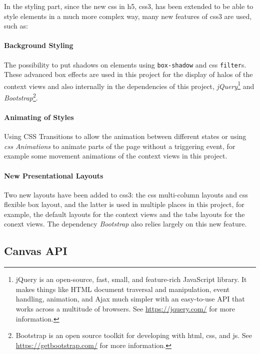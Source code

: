 In the styling part, since the new \gls{css} in \gls{h5}, \gls{css3}, has been extended to be able to style elements in a much more complex way, many new features of \gls{css3} are used, such as:

\paragraph{Background Styling}

The possibility to put shadows on elements using \texttt{box-shadow} and \gls{css} \texttt{filter}s. These advanced box effects are used in this project for the display of halos of the context views and also internally in the dependencies of this project, \emph{jQuery}\footnote{ jQuery is an open-source, fast, small, and feature-rich JavaScript library. It makes things like HTML document traversal and manipulation, event handling, animation, and Ajax much simpler with an easy-to-use API that works across a multitude of browsers. See \url{https://jquery.com/} for more information.} and \emph{Bootstrap}\footnote{ Bootstrap is an open source toolkit for developing with \gls{html}, \gls{css}, and \gls{js}. See \url{https://getbootstrap.com/} for more information.}.

\paragraph{Animating of Styles}

Using CSS Transitions to allow the animation between different states or using \emph{\gls{css} Animations} to animate parts of the page without a triggering event, for example some movement animations of the context views in this project.

\paragraph{New Presentational Layouts}

Two new layouts have been added to \gls{css3}: the \gls{css} multi-column layouts and \gls{css} flexible box layout, and the latter is used in multiple places in this project, for example, the default layouts for the context views and the tabs layouts for the conext views. The dependency \emph{Bootstrap} also relies largely on this new feature.

\subsection{Canvas API}

